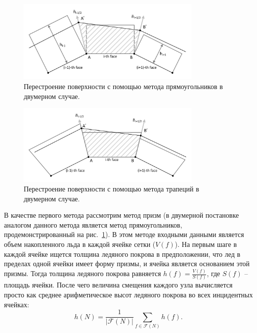 \begin{figure}[h]
\centering
\includegraphics[width=0.8\textwidth]{pics/text_1_remesh_3d/pic_classical_methods_rectangles.pdf}
\caption{Перестроение поверхности с помощью метода прямоугольников в двумерном случае.}
\label{fig:text_1_remesh3_rect}
\end{figure}

\begin{figure}[ht]
\centering
\includegraphics[width=0.8\textwidth]{pics/text_1_remesh_3d/pic_classical_methods_trapezoids.pdf}
\caption{Перестроение поверхности с помощью метода трапеций в двумерном случае.}
\label{fig:text_1_remesh3_trap}
\end{figure}

В качестве первого метода рассмотрим метод призм (в двумерной постановке аналогом данного метода является метод прямоугольников, продемонстрированный на рис.~\ref{fig:text_1_remesh3_rect}).
В этом методе входными данными является объем накопленного льда в каждой ячейке сетки ($V(f)$).
На первым шаге в каждой ячейке ищется толщина ледяного покрова в предположении, что лед в пределах одной ячейки имеет форму призмы, и ячейка является основанием этой призмы.
Тогда толщина ледяного покрова равняется $h(f) = \frac{V(f)}{S(f)}$, где $S(f)$ -- площадь ячейки.
После чего величина смещения каждого узла вычисляется просто как среднее арифметическое высот ледяного покрова во всех инцидентных ячейках:
\begin{equation}
h(N) = \frac{1}{|\mathscr{F}(N)|} \sum_{f \in \mathscr{F}(N)}{h(f)}.
\end{equation}

